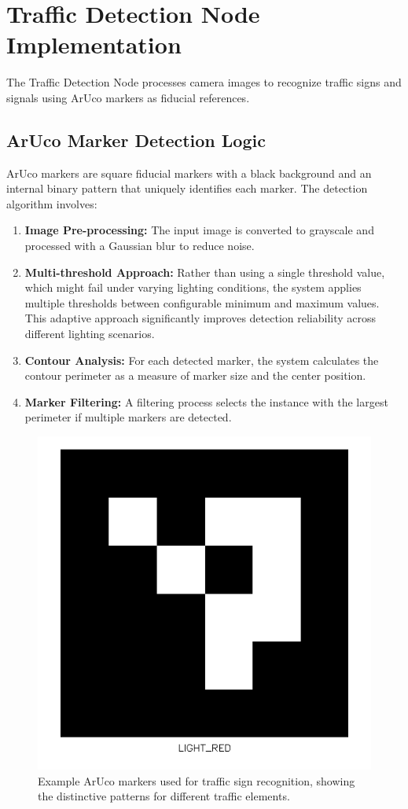 \documentclass[9pt,technote]{IEEEtran}
\begin{document}
\section{Traffic Detection Node Implementation}
The Traffic Detection Node processes camera images to recognize traffic signs and signals using ArUco markers as fiducial references.

\subsection{ArUco Marker Detection Logic}
ArUco markers are square fiducial markers with a black background and an internal binary pattern that uniquely identifies each marker. The detection algorithm involves:

\begin{enumerate}
    \item \textbf{Image Pre-processing:} The input image is converted to grayscale and processed with a Gaussian blur to reduce noise.
    
    \item \textbf{Multi-threshold Approach:} Rather than using a single threshold value, which might fail under varying lighting conditions, the system applies multiple thresholds between configurable minimum and maximum values. This adaptive approach significantly improves detection reliability across different lighting scenarios.
    
    \item \textbf{Contour Analysis:} For each detected marker, the system calculates the contour perimeter as a measure of marker size and the center position.
    
    \item \textbf{Marker Filtering:} A filtering process selects the instance with the largest perimeter if multiple markers are detected.
\end{enumerate}

\begin{figure}[H]
    \centering
    \includegraphics[width=0.6\columnwidth]{figures/aruco_markers_placeholder.png}
    \caption{Example ArUco markers used for traffic sign recognition, showing the distinctive patterns for different traffic elements.}
    \label{fig:aruco_markers}
\end{figure}
\end{document}
